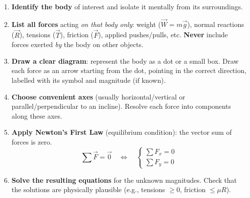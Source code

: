\documentclass[11pt]{article}
\begin{document}
\begin{methode}
\begin{enumerate}
    \item \textbf{Identify the body} of interest and isolate it mentally from its surroundings.
    \item \textbf{List all forces} acting \emph{on that body only}: weight ($\vec{W}=m\vec{g}$), normal reactions ($\vec{R}$), tensions ($\vec{T}$), friction ($\vec{F}$), applied pushes/pulls, etc. \textbf{Never} include forces exerted \emph{by} the body on other objects.
    \item \textbf{Draw a clear diagram}: represent the body as a dot or a small box. Draw each force as an arrow starting from the dot, pointing in the correct direction, labelled with its symbol and magnitude (if known).
    \item \textbf{Choose convenient axes} (usually horizontal/vertical or parallel/perpendicular to an incline). Resolve each force into components along these axes.
    \item \textbf{Apply Newton's First Law} (equilibrium condition): the vector sum of forces is zero.
    \[
    \sum \vec{F} = \vec{0} \quad\Longleftrightarrow\quad 
    \begin{cases}
    \sum F_x = 0 \\
    \sum F_y = 0
    \end{cases}
    \]
    \item \textbf{Solve the resulting equations} for the unknown magnitudes. Check that the solutions are physically plausible (e.g., tensions $\ge 0$, friction $\le \mu R$).
\end{enumerate}
\end{methode}
\end{document}
